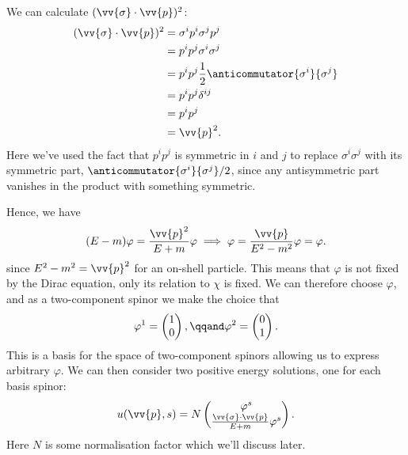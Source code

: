 \documentclass[fleqn]{NotesClass}
\begin{document}
    We can calculate \((\vv{\sigma} \cdot \vv{p})^2\):
    \begin{align}
        (\vv{\sigma} \cdot \vv{p})^2 &= \sigma^i p^i \sigma^j p^j\\
        &= p^ip^j \sigma^i\sigma^j\\
        &= p^ip^j \frac{1}{2}\anticommutator{\sigma^i}{\sigma^j}\\
        &= p^ip^j \delta^{ij}\\
        &= p^ip^j\\
        &= \vv{p}^2.
    \end{align}
    Here we've used the fact that \(p^ip^j\) is symmetric in \(i\) and \(j\) to replace \(\sigma^i\sigma^j\) with its symmetric part, \(\anticommutator{\sigma^i}{\sigma^j}/2\), since any antisymmetric part vanishes in the product with something symmetric.
    
    Hence, we have
    \begin{equation}
        (E - m)\varphi = \frac{\vv{p}^2}{E + m}\varphi \implies \varphi = \frac{\vv{p}}{E^2 - m^2}\varphi = \varphi.
    \end{equation}
    since \(E^2 - m^2 = \vv{p}^2\) for an on-shell particle.
    This means that \(\varphi\) is not fixed by the Dirac equation, only its relation to \(\chi\) is fixed.
    We can therefore choose \(\varphi\), and as a two-component spinor we make the choice that
    \begin{equation}
        \varphi^1 = 
        \begin{pmatrix}
            1\\ 0
        \end{pmatrix}
        , \qqand \varphi^2 = 
        \begin{pmatrix}
            0\\ 1
        \end{pmatrix}
        .
    \end{equation}
    This is a basis for the space of two-component spinors allowing us to express arbitrary \(\varphi\).
    We can then consider two positive energy solutions, one for each basis spinor:
    \begin{equation}
        u(\vv{p}, s) = N
        \begin{pmatrix}
            \varphi^s\\
            \frac{\vv{\sigma} \cdot \vv{p}}{E + m}\varphi^s
        \end{pmatrix}
        .
    \end{equation}
    Here \(N\) is some normalisation factor which we'll discuss later.
    
\end{document}
